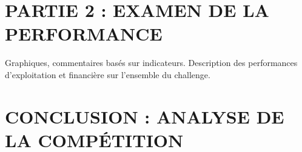\documentclass[a4paper]{article}
\begin{document}
\section{PARTIE 2 : EXAMEN DE LA PERFORMANCE}
Graphiques, commentaires basés sur indicateurs. Description des performances 
d'exploitation et financière sur l'ensemble du challenge.

\section{CONCLUSION : ANALYSE DE LA COMPÉTITION}
\end{document}
